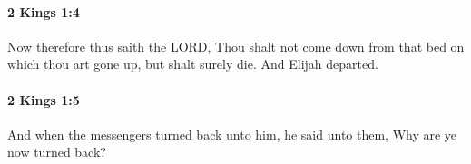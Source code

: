 		\paragraph{2 Kings 1:4} %
			\label{2KINGS-1-4}

			Now therefore thus saith the LORD, Thou shalt not come down from that bed on which thou art gone up, but shalt surely die. And Elijah departed.


		\paragraph{2 Kings 1:5} %
			\label{2KINGS-1-5}

			And when the messengers turned back unto him, he said unto them, Why are ye now turned back?


